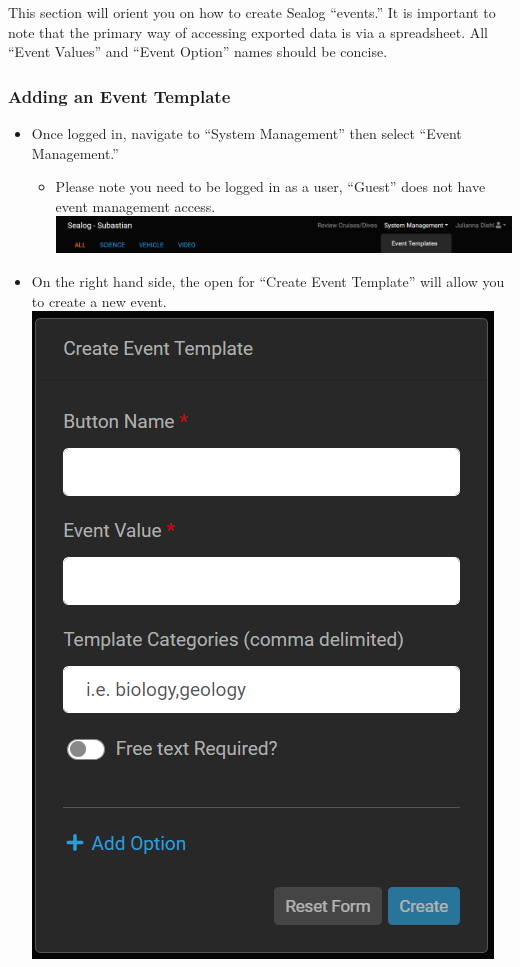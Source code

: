 \documentclass[
  letterpaper,
  DIV=11,
  numbers=noendperiod]{scrreprt}
\providecommand{\tightlist}{%
  \setlength{\itemsep}{0pt}\setlength{\parskip}{0pt}}\usepackage{longtable,booktabs,array}
\begin{document}
This section will orient you on how to create Sealog ``events.'' It is
important to note that the primary way of accessing exported data is via
a spreadsheet. All ``Event Values'' and ``Event Option'' names should be
concise.

\hypertarget{adding-an-event-template}{%
\subsubsection{Adding an Event
Template}\label{adding-an-event-template}}

\begin{itemize}
\tightlist
\item
  Once logged in, navigate to ``System Management'' then select ``Event
  Management.''

  \begin{itemize}
  \tightlist
  \item
    Please note you need to be logged in as a user, ``Guest'' does not
    have event management access. \includegraphics{images/image21.png}
  \end{itemize}
\item
  On the right hand side, the open for ``Create Event Template'' will
  allow you to create a new event. \includegraphics{images/image9.png}
\end{itemize}
\end{document}
